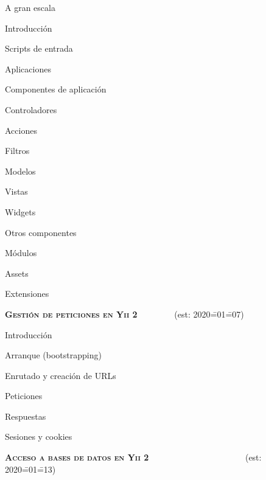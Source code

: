 \begin{longenum}
\begin{longenum}
        \item A gran escala
        \begin{longenum}
            \item Introducción
            \item Scripts de entrada
            \item Aplicaciones
            \item Componentes de aplicación
            \item Controladores
            \begin{longenum}
                \item Acciones
                \item Filtros
            \end{longenum}
            \item Modelos
            \item Vistas
            \begin{longenum}
                \item Widgets
            \end{longenum}
            \item Otros componentes
            \begin{longenum}
                \item Módulos
                \item Assets
                \item Extensiones
            \end{longenum}
        \end{longenum}
    \end{longenum}
    \item \textbf{\textsc{Gestión de peticiones en Yii 2}} \ \ \ \ \ \ \ \ (est: 2020\==01\==07)
    \begin{longenum}
        \item Introducción
        \item Arranque (bootstrapping)
        \item Enrutado y creación de URLs
        \item Peticiones
        \item Respuestas
        \item Sesiones y cookies
    \end{longenum}
    \item \textbf{\textsc{Acceso a bases de datos en Yii 2}} \ \ \ \ \ \ \ \ \ \ \ \ \ \ \ \ \ \ \ \ \ \ (est: 2020\==01\==13)

\end{longenum}
